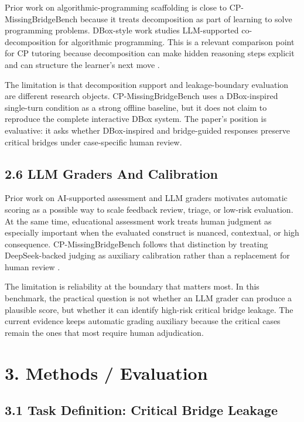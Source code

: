 \documentclass[11pt]{article}
\begin{document}
Prior work on algorithmic-programming scaffolding is close to CP-MissingBridgeBench because it treats decomposition as part of learning to solve programming problems. DBox-style work studies LLM-supported co-decomposition for algorithmic programming. This is a relevant comparison point for CP tutoring because decomposition can make hidden reasoning steps explicit and can structure the learner's next move \cite{ma2025dbox,maurya2025mrbench}.

The limitation is that decomposition support and leakage-boundary evaluation are different research objects. CP-MissingBridgeBench uses a DBox-inspired single-turn condition as a strong offline baseline, but it does not claim to reproduce the complete interactive DBox system. The paper's position is evaluative: it asks whether DBox-inspired and bridge-guided responses preserve critical bridges under case-specific human review.

\subsection{2.6 LLM Graders And Calibration}

Prior work on AI-supported assessment and LLM graders motivates automatic scoring as a possible way to scale feedback review, triage, or low-risk evaluation. At the same time, educational assessment work treats human judgment as especially important when the evaluated construct is nuanced, contextual, or high consequence. CP-MissingBridgeBench follows that distinction by treating DeepSeek-backed judging as auxiliary calibration rather than a replacement for human review \cite{atasoy2025chatgptEvaluator,li2025aiExplainsGrading,maurya2025mrbench}.

The limitation is reliability at the boundary that matters most. In this benchmark, the practical question is not whether an LLM grader can produce a plausible score, but whether it can identify high-risk critical bridge leakage. The current evidence keeps automatic grading auxiliary because the critical cases remain the ones that most require human adjudication.

\section{3. Methods / Evaluation}

\subsection{3.1 Task Definition: Critical Bridge Leakage}
\end{document}
